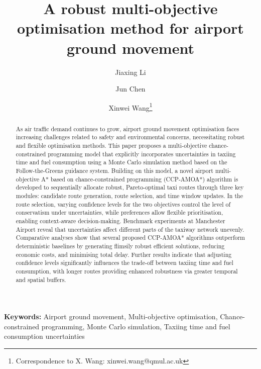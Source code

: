 \documentclass{article}
\date{}
\newcommand{\keywords}[1]{\textbf{Keywords:} #1}
\begin{document}
\title{A robust multi-objective optimisation method for airport ground movement}

\author[1]{Jiaxing Li}
\author[1]{Jun Chen} 
\author[1]{Xinwei Wang\thanks{Correspondence to X. Wang: xinwei.wang@qmul.ac.uk}}



\maketitle

\begin{abstract}

As air traffic demand continues to grow, airport ground movement optimisation faces increasing challenges related to safety and environmental concerns, necessitating robust and flexible optimisation methods. This paper proposes a multi-objective chance-constrained programming model that explicitly incorporates uncertainties in taxiing time and fuel consumption using a Monte Carlo simulation method based on the Follow-the-Greens guidance system. Building on this model, a novel airport multi-objective A* based on chance-constrained programming (CCP-AMOA*) algorithm is developed to sequentially allocate robust, Pareto-optimal taxi routes through three key modules: candidate route generation, route selection, and time window updates. In the route selection, varying confidence levels for the two objectives control the level of conservatism under uncertainties, while preferences allow flexible prioritisation, enabling context-aware decision-making. Benchmark experiments at Manchester Airport reveal that uncertainties affect different parts of the taxiway network unevenly. Comparative analyses show that several proposed CCP-AMOA* algorithms outperform deterministic baselines by generating flimsily robust efficient solutions, reducing economic costs, and minimising total delay. Further results indicate that adjusting confidence levels significantly influences the trade-off between taxiing time and fuel consumption, with longer routes providing enhanced robustness via greater temporal and spatial buffers. 

\end{abstract}

\keywords{
Airport ground movement, 
Multi-objective optimisation, 
Chance-constrained programming,
Monte Carlo simulation,
Taxiing time and fuel consumption uncertainties}
\end{document}
